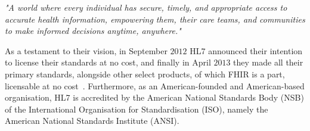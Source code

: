 \begin{center}
    \emph{"A world where every individual has secure, timely, and appropriate access to accurate health information, empowering them, their care teams, and communities to make informed decisions anytime, anywhere."}
\end{center}
As a testament to their vision, in September $2012$ HL7 announced their intention to license their standards at no cost, and finally in April $2013$ they made all their primary standards, alongside other select products, of which FHIR is a part, licensable at no cost~\cite{HL7-no-cost}. Furthermore, as an American-founded and American-based organisation, HL7 is accredited by the American National Standards Body (NSB) of the International Organisation for Standardisation (ISO), namely the American National Standards Institute (ANSI). 	